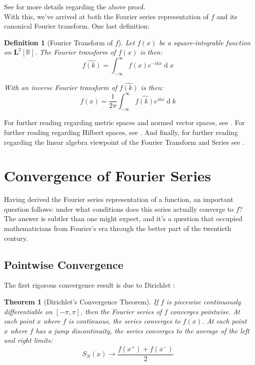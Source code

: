 \documentclass[12pt,a4paper]{report}
\DeclareMathOperator{\deriv}{d}
\theoremstyle{thms}
\newtheorem{theorem}{Theorem}[section]
\theoremstyle{defns}
\newtheorem{definition}{Definition}[section]
\begin{document}
See \cite{strauss_fourier} for more details regarding the above proof.\\
With this, we've arrived at both the Fourier series representation of $f$ and its canonical Fourier transform. One last definition:

\begin{definition}[Fourier Transform of $f$]
    Let $f(x)$ be a square-integrable function on $\mathbf{L}^2[\mathbb{R}]$. The Fourier transform of $f(x)$ is then:
    \begin{equation}
        \hat{f(k)} = \int_{-\infty}^{\infty} f(x)e^{-ikx}\deriv{x}
    \end{equation}

    With an inverse Fourier transform of $\hat{f(k)}$ is then:
    \begin{equation}
        f(x) = \dfrac{1}{2\pi}\int_{-\infty}^{\infty} \hat{f(k)}e^{ikx}\deriv{k}
    \end{equation}
\end{definition}

For further reading regarding metric spaces and normed vector spaces, see \cite{kreyszig_functional}. For further reading regarding Hilbert spaces, see \cite{holland_schwarz}. And finally, for further reading regarding the linear algebra viewpoint of the Fourier Transform and Series see \cite{axler_linear}.

\section{Convergence of Fourier Series}
\label{sec:convergence}

Having derived the Fourier series representation of a function, an important question follows: under what conditions does this series actually converge to $f$? The answer is subtler than one might expect, and it's a question that occupied mathematicians from Fourier's era through the better part of the twentieth century.

\subsection*{Pointwise Convergence}
The first rigorous convergence result is due to Dirichlet \cite{dirichlet_convergence}:

\begin{theorem}[Dirichlet's Convergence Theorem]
    If $f$ is piecewise continuously differentiable on $[-\pi, \pi]$, then the Fourier series of $f$ converges pointwise. At each point $x$ where $f$ is continuous, the series converges to $f(x)$. At each point $x$ where $f$ has a jump discontinuity, the series converges to the average of the left and right limits:
    \begin{equation}
        S_N(x) \to \dfrac{f(x^+) + f(x^-)}{2}
    \end{equation}
    \label{thm:dirichlet}
\end{theorem}
\end{document}
